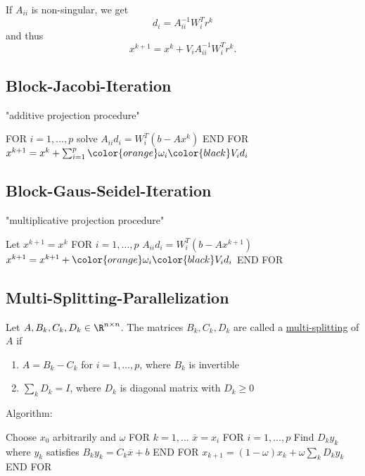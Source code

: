 If $A_{ii}$ is non-singular, we get
\[
d_{i} = A_{ii}^{-1} W_{i}^{T} r^{k}
\] 
and thus
\[
x^{k+1} = x^{k}+ V_{i}A_{ii}^{-1}W_{i}^{T} r^{k}
.\] 


\subsection*{Block-Jacobi-Iteration}
\label{sec:Block-Jacobi-Iteration}
"additive projection procedure"

FOR $i=1, \ldots, p$
	solve $A_{ii}d_{i} = W_{i}^{T}(b-Ax^{k})$
END FOR
$x^{k+1}= x^{k} + \sum_{i=1}^{p}{\color{orange}\omega _{i}\color{black}V_{i}d_{i}}$

\subsection*{Block-Gaus-Seidel-Iteration}
\label{sec:Block-Jacobi-Iteration}
"multiplicative projection procedure"

Let $x^{k+1} = x^{k}$
FOR $i=1, \ldots, p$
	$A_{ii}d_{i} = W_{i}^{T}(b-Ax^{k+1})$
	$x^{k+1} = x^{k+1} +\color{orange}\omega _{i}\color{black} V_{i}d_{i}$
END FOR

\subsection*{Multi-Splitting-Parallelization}
\label{sec:Multi-Splitting-Parallelization}

\begin{defintion}
	Let $A, B_{k}, C_{k}, D_{k}\in \R^{n \times n}$.
	The matrices $B_{k}, C_{k}, D_{k}$ are called a \underline{multi-splitting} of $A$ if
	\begin{enumerate}[label=(\arabic{enumi})]
		\item $A = B_{k} - C_{k}$ for $i=1, \ldots, p$, where $B_{k}$ is invertible
		\item $\sum_{k}^{}{D_{k}} = I$, where $D_{k}$ is diagonal matrix with $D_{k} \geq  0$
	\end{enumerate}
\end{defintion}

Algorithm:

Choose $x_0$ arbitrarily and $\omega $
FOR $k=1,\ldots $
	$\overline{x} = x_{i}$
	FOR $i=1, \ldots, p$
	Find $D_{k}y_{k}$ where $y_{k}$ satisfies $B_{k}y_{k} = C_{k}\overline{x}+b$
	END FOR
	$x_{k+1} = (1-\omega ) x_{k} + \omega \sum_{k}^{}{D_{k}y_{k}}$
END FOR
